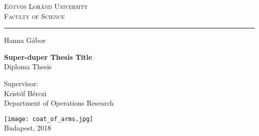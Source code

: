 \begin{titlepage}
  \begin{center}
    \textsc{
      \large
      Eötvös Loránd University \\
      Faculty of Science \\
    }
    \vspace{0.4cm}

    \rule{14cm}{0.4pt}
    \vspace*{1.2cm}

    \LARGE{Hanna Gábor}

    \huge
    \vspace{0.6cm}
    \textbf{Super-duper Thesis Title} \\
    \vspace{0.3cm}
    \normalsize
    Diploma Thesis \\
    \vspace{1.5cm}

    \large
    Supervisor: \\
    \vspace{0.3cm}
    Kristóf Bérczi \\
    Department of Operations Research

    \vfill

    \texttt{[image: coat\_of\_arms.jpg]} \\
    \vspace{0.1cm}
    \normalsize
    Budapest, 2018
  \end{center}
\end{titlepage}

